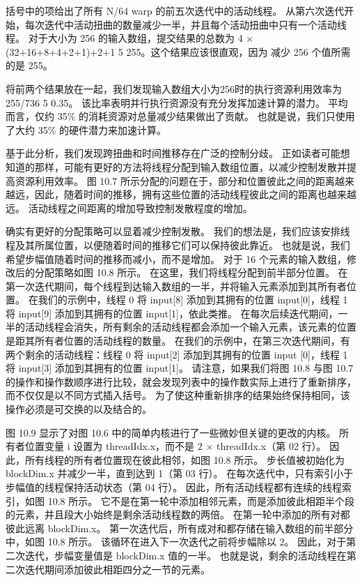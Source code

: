 括号中的项给出了所有 N/64 warp 的前五次迭代中的活动线程。 从第六次迭代开始，每次迭代中活动扭曲的数量减少一半，并且每个活动扭曲中只有一个活动线程。 对于大小为 256 的输入数组，提交结果的总数为 4 × (32+16+8+4+2+1)+2+1 5 255。这个结果应该很直观，因为 减少 256 个值所需的是 255。

将前两个结果放在一起，我们发现输入数组大小为256时的执行资源利用效率为255/736 5 0.35。 该比率表明并行执行资源没有充分发挥加速计算的潜力。 平均而言，仅约 35\% 的消耗资源对总量减少结果做出了贡献。 也就是说，我们只使用了大约 35\% 的硬件潜力来加速计算。

基于此分析，我们发现跨扭曲和时间推移存在广泛的控制分歧。 正如读者可能想知道的那样，可能有更好的方法将线程分配到输入数组位置，以减少控制发散并提高资源利用效率。 图 10.7 所示分配的问题在于，部分和位置彼此之间的距离越来越远，因此，随着时间的推移，拥有这些位置的活动线程彼此之间的距离也越来越远。 活动线程之间距离的增加导致控制发散程度的增加。

确实有更好的分配策略可以显着减少控制发散。 我们的想法是，我们应该安排线程及其所属位置，以便随着时间的推移它们可以保持彼此靠近。 也就是说，我们希望步幅值随着时间的推移而减小，而不是增加。 对于 16 个元素的输入数组，修改后的分配策略如图 10.8 所示。 在这里，我们将线程分配到前半部分位置。 在第一次迭代期间，每个线程到达输入数组的一半，并将输入元素添加到其所有者位置。 在我们的示例中，线程 0 将 input[8] 添加到其拥有的位置 input[0]，线程 1 将 input[9] 添加到其拥有的位置 input[1]，依此类推。 在每次后续迭代期间，一半的活动线程会消失，所有剩余的活动线程都会添加一个输入元素，该元素的位置是距其所有者位置的活动线程的数量。 在我们的示例中，在第三次迭代期间，有两个剩余的活动线程：线程 0 将 input[2] 添加到其拥有的位置 input [0]，线程 1 将 input[3] 添加到其拥有的位置 input[1]。 请注意，如果我们将图 10.8 与图 10.7 的操作和操作数顺序进行比较，就会发现列表中的操作数实际上进行了重新排序，而不仅仅是以不同方式插入括号。 为了使这种重新排序的结果始终保持相同，该操作必须是可交换的以及结合的。

图 10.9 显示了对图 10.6 中的简单内核进行了一些微妙但关键的更改的内核。 所有者位置变量 i 设置为 threadIdx.x，而不是 2 × threadIdx.x（第 02 行）。 因此，所有线程的所有者位置现在彼此相邻，如图 10.8 所示。 步长值被初始化为 blockDim.x 并减少一半，直到达到 1（第 03 行）。 在每次迭代中，只有索引小于步幅值的线程保持活动状态（第 04 行）。 因此，所有活动线程都有连续的线程索引，如图 10.8 所示。 它不是在第一轮中添加相邻元素，而是添加彼此相距半个段的元素，并且段大小始终是剩余活动线程数的两倍。 在第一轮中添加的所有对都彼此远离 blockDim.x。 第一次迭代后，所有成对和都存储在输入数组的前半部分中，如图 10.8 所示。 该循环在进入下一次迭代之前将步幅除以 2。 因此，对于第二次迭代，步幅变量值是 blockDim.x 值的一半。 也就是说，剩余的活动线程在第二次迭代期间添加彼此相距四分之一节的元素。

